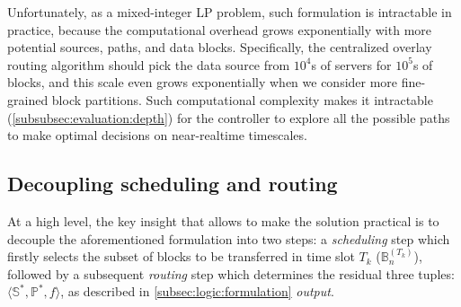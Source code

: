 Unfortunately, as a mixed-integer LP problem, such formulation is intractable in practice, because the computational overhead grows exponentially with more potential sources, paths, and data blocks. Specifically, the centralized overlay routing algorithm should pick the data source from $10^4$s of servers for $10^5$s of blocks, and this scale even grows exponentially when we consider more fine-grained block partitions. Such computational complexity makes it intractable (\Section\ref{subsubsec:evaluation:depth}) for the controller to explore all the possible paths to make optimal decisions on near-realtime timescales.


\subsection{Decoupling scheduling and routing}
\label{subsec:logic:separation}

At a high level, the key insight that allows \name to make the solution practical is
to decouple the aforementioned formulation into two steps:
a {\em scheduling} step which firstly selects the subset of blocks to be transferred in time slot $T_k$
($\mathbb{B}^{(T_k)}_n$), followed by a subsequent {\em routing}
step which determines the residual three tuples: $\langle \mathbb{S}^*, \mathbb{P}^*, f \rangle$, as described in \Section\ref{subsec:logic:formulation} {\em output}.

